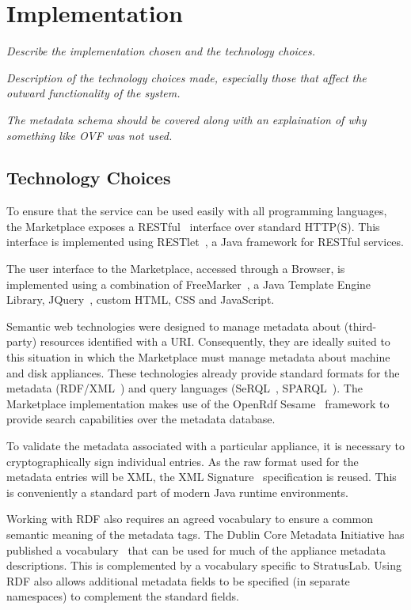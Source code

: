 \section{Implementation}
\label{sec:implementation}

{\em Describe the implementation chosen and the technology choices.}

{\em Description of the technology choices made, especially those that
  affect the outward functionality of the system.}

{\em The metadata schema should be covered along with an explaination
  of why something like OVF was not used.}

\subsection{Technology Choices}

To ensure that the service can be used easily with all programming
languages, the Marketplace exposes a RESTful~\cite{rest} interface
over standard HTTP(S).  This interface is implemented using
RESTlet~\cite{restlet}, a Java framework for RESTful
services.

The user interface to the Marketplace, accessed through a Browser, is implemented
using a combination of FreeMarker~\cite{freemarker}, a Java Template Engine Library, 
JQuery~\cite{jquery}, custom HTML, CSS and JavaScript. 

Semantic web technologies were designed to manage metadata about
(third-party) resources identified with a URI.  Consequently, they are
ideally suited to this situation in which the Marketplace must manage
metadata about machine and disk appliances.  These technologies already
provide standard formats for the metadata (RDF/XML~\cite{rdfxml,
  rdfprimer, rdfschema}) and query languages (SeRQL~\cite{serql},
SPARQL~\cite{sparql}).  The Marketplace implementation makes use of the
OpenRdf Sesame~\cite{sesame} framework to provide search
capabilities over the metadata database.

To validate the metadata associated with a particular appliance, it is
necessary to cryptographically sign individual entries.  As the raw
format used for the metadata entries will be XML, the XML
Signature~\cite{xmlsig} specification is reused.  This is
conveniently a standard part of modern Java runtime environments.

Working with RDF also requires an agreed vocabulary to ensure a common
semantic meaning of the metadata tags.  The Dublin Core Metadata
Initiative has published a vocabulary~\cite{dcterms} that can be used
for much of the appliance metadata descriptions.  This is complemented by
a vocabulary specific to StratusLab.  Using RDF also allows additional
metadata fields to be specified (in separate namespaces) to complement
the standard fields.

